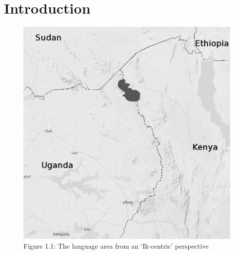 \documentclass[output=book,
  nonflat,
  modfonts 
		  ]{langsci/langscibook}
\begin{document}
     
 
 

\maketitle                
\frontmatter

\tableofcontents


%  
\mainmatter   
\part{Introduction}



\begin{figure}[p]
 \includegraphics[width=\textwidth]{ikmap.png}
\\
{Figure 1.1: The language area from an `Ik-centric' perspective}
\end{figure}
\end{document}
